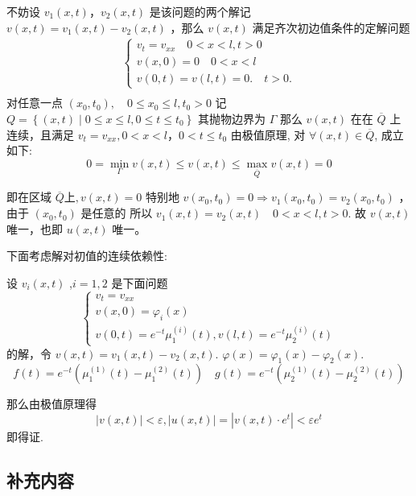 \begin{questions}
\begin{solution}
不妨设 $ v_{1}(x, t) ， v_{2}(x, t) $ 是该问题的两个解记 $ v(x, t)=v_{1}(x, t)-v_{2}(x, t) $ ，那么 $ v(x, t) $ 满足齐次初边值条件的定解问题
$$
\begin{array}{l}
\left\{\begin{array}{l}
v_{t}=v_{x x} \quad 0 < x < l, t>0 \\
v(x, 0)=0 \quad 0 < x < l \\
v(0, t)=v(l, t)=0 . \quad t > 0 .
\end{array}\right. \\
\end{array}
$$
 对任意一点 $\left(x_{0}, t_{0}\right), \quad 0 \leq x_{0} \leq l, t_{0}>0$
记 $Q=\left\{(x, t) \mid 0 \leqslant x \leqslant l,0 \leqslant t \leqslant t_{0}\right\}$ 其抛物边界为 $ \Gamma $
那么 $ v(x, t) $ 在在 $ \overline{Q} $ 上连续，且满足 $ v_{t}=v_{x x}, 0< x < l ， 0 < t \leqslant t_{0} $
由极值原理, 对 $ \forall(x, t) \in \overline{Q} $, 成立如下:
$$
0=\min _{\Gamma} v(x, t) \leqslant v(x, t) \leqslant \max _{\overline{Q}} v(x, t)=0
$$

即在区域 $ \overline{Q} 上, v(x, t)=0 $
特别地 $ v\left(x_{0}, t_{0}\right)=0 \Rightarrow v_{1}\left(x_{0}, t_{0}\right)=v_{2}\left(x_{0}, t_{0}\right) $ ，由于 $ \left(x_{0}, t_{0}\right) $ 是任意的
所以 $ v_{1}(x, t)=v_{2}(x, t) \quad 0 < x < l, t>0 $.
故 $ v(x, t) $ 唯一，也即 $ u(x, t) $ 唯一。

下面考虑解对初值的连续依赖性:

设 $v_{i}(x, t) $ ,$i=1,2$ 是下面问题 
$$\left\{\begin{array}{l}v_{t}=v_{x x} \\ v(x, 0)=\varphi_{i}(x) \\ v(0, t)=e^{-t} \mu_{1}^{(i)}(t), v(l, t)=e^{-t} \mu_{2}^{(i)}(t)\end{array}\right. $$
的解，令 $ v(x, t)=v_{1}(x, t)-v_{2}(x, t) $. $ \varphi(x)=\varphi_{1}(x)-\varphi_{2}(x) $.
$$
f(t)=e^{-t}\left(\mu_{1}^{(1)}(t)-\mu_{1}^{(2)}(t)\right) \quad g(t)=e^{-t}\left(\mu_{2}^{(1)}(t)-\mu_{2}^{(2)}(t)\right)
$$

那么由极值原理得 
$$|v(x, t)|< \varepsilon ,|u(x, t)|= \left|v(x, t) \cdot e^{t}\right|<\varepsilon e^{t} $$
即得证.

\end{solution}
\end{questions}


\subsection{补充内容}

